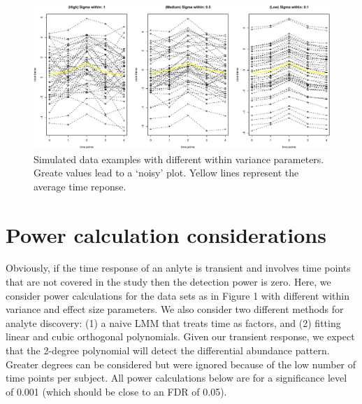 \documentclass[]{article}
\begin{document}
\begin{figure}
\centering
\includegraphics{power_calculations_files/figure-latex/funcs-1.pdf}
\caption{Simulated data examples with different within variance
parameters. Greate values lead to a `noisy' plot. Yellow lines represent
the average time reponse.}
\end{figure}

\section{Power calculation
considerations}\label{power-calculation-considerations}

Obviously, if the time response of an anlyte is transient and involves
time points that are not covered in the study then the detection power
is zero. Here, we consider power calculations for the data sets as in
Figure 1 with different within variance and effect size parameters. We
also consider two different methods for analyte discovery: (1) a naive
LMM that treats time as factors, and (2) fitting linear and cubic
orthogonal polynomials. Given our transient response, we expect that the
2-degree polynomial will detect the differential abundance pattern.
Greater degrees can be considered but were ignored because of the low
number of time points per subject. All power calculations below are for
a significance level of 0.001 (which should be close to an FDR of 0.05).
\end{document}
